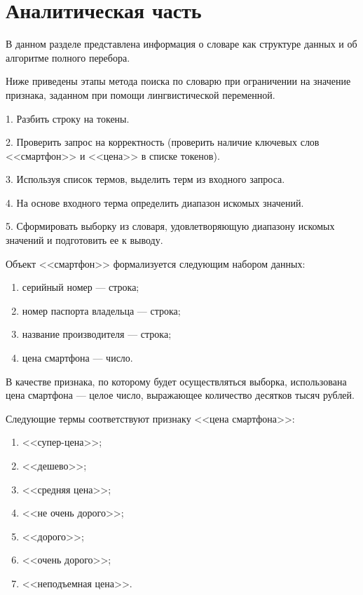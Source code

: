 \chapter{Аналитическая часть}

В данном разделе представлена информация о словаре как структуре данных и об алгоритме полного перебора.

Ниже приведены этапы метода поиска по словарю при ограничении на значение признака, заданном при помощи лингвистической переменной.

1. Разбить строку на токены.

2. Проверить запрос на корректность (проверить наличие ключевых слов <<смартфон>> и <<цена>> в списке токенов).

3. Используя список термов, выделить терм из входного запроса.

4. На основе входного терма определить диапазон искомых значений.

5. Сформировать выборку из словаря, удовлетворяющую диапазону искомых значений и подготовить ее к выводу.

Объект <<смартфон>> формализуется следующим набором данных:
\begin{enumerate}
	\item серийный номер --- строка;
	\item номер паспорта владельца --- строка;
	\item название производителя --- строка;
	\item цена смартфона --- число.
\end{enumerate}

В качестве признака, по которому будет осуществляться выборка, использована цена смартфона  --- целое число, выражающее количество десятков тысяч рублей.


Следующие термы соответствуют признаку <<цена смартфона>>:
\begin{enumerate}
	\item <<супер-цена>>;
	\item <<дешево>>;
	\item <<средняя цена>>;
	\item <<не очень дорого>>;
	\item <<дорого>>;
	\item <<очень дорого>>;
	\item <<неподъемная цена>>.
\end{enumerate}

